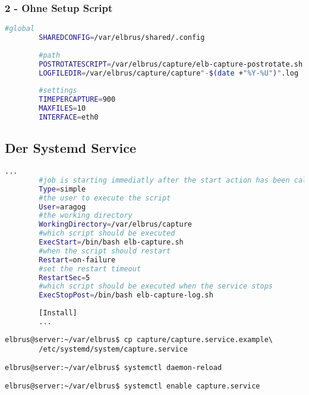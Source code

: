 \documentclass{article}
\begin{document}
	\subsubsection{2 - Ohne Setup Script}
	\lstset{style=files}
	\begin{lstlisting}[caption={Anhand von '.env.example' eigene '.env' Datei anlegen}, language=bash]
		#global
		SHAREDCONFIG=/var/elbrus/shared/.config
		
		#path
		POSTROTATESCRIPT=/var/elbrus/capture/elb-capture-postrotate.sh
		LOGFILEDIR=/var/elbrus/capture/capture"-$(date +"%Y-%U")".log
		
		#settings
		TIMEPERCAPTURE=900
		MAXFILES=10
		INTERFACE=eth0
	\end{lstlisting}

	\newpage
	\subsection[systemd service]{Der Systemd Service}
	\begin{lstlisting}[caption={capture.service.example - Die Variable 'WorkingDirectory', Die Variable 'User' sowie die Variable 'ExecStopPost' anpassen.},language=bash ,keywords={WorkingDirectory, User, ExecStopPost}, keywordstyle=\color{red}, firstnumber=3]
		...
		#job is starting immediatly after the start action has been called
		Type=simple
		#the user to execute the script
		User=aragog
		#the working directory
		WorkingDirectory=/var/elbrus/capture
		#which script should be executed
		ExecStart=/bin/bash elb-capture.sh
		#when the script should restart
		Restart=on-failure
		#set the restart timeout
		RestartSec=5
		#which script should be executed when the service stops
		ExecStopPost=/bin/bash elb-capture-log.sh
		
		[Install]
		...
	\end{lstlisting}
	
	\lstset{style=commands}
	\begin{lstlisting}[caption={Kopieren des Serviceprogrammes}]
		elbrus@server:~/var/elbrus$ cp capture/capture.service.example\
		/etc/systemd/system/capture.service
	\end{lstlisting}

	\begin{lstlisting}[caption={Neuladen des 'systemctl' Deamons}]
		elbrus@server:~/var/elbrus$ systemctl daemon-reload
	\end{lstlisting}
	
	\begin{lstlisting}[caption={Aktivieren des Serviceprogrammes}]
		elbrus@server:~/var/elbrus$ systemctl enable capture.service
	\end{lstlisting}
\end{document}
